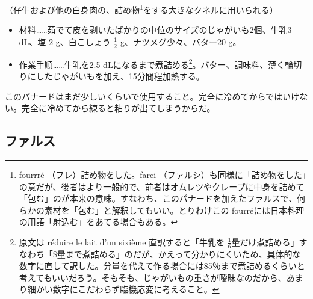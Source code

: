 \begin{recette}
（仔牛および他の白身肉の、詰め物\footnote{fourrré
  （フレ）詰め物をした。farci
  （ファルシ）も同様に「詰め物をした」の意だが、後者はより一般的で、前者はオムレツやクレープに中身を詰めて「包む」のが本来の意味。すなわち、このパナードを加えたファルスで、何らかの素材を「包む」と解釈してもいい。とりわけこの
  fourréには日本料理の用語「射込む」をあてる場合もある。}をする大きなクネルに用いられる）

\begin{itemize}
\item
  材料\ldots{}\ldots{}茹でて皮を剥いたばかりの中位のサイズのじゃがいも2個、牛乳3
  dL、塩 2 g、白こしょう \(\frac{1}{2}\) g、ナツメグ少々、バター20 g。
\item
  作業手順\ldots{}\ldots{}牛乳を2.5 dLになるまで煮詰める\footnote{原文は
    réduire le lait d'un sixième 直訳すると「牛乳を
    \(\frac{1}{6}\)量だけ煮詰める」すなわち「\$量まで煮詰める」のだが、かえって分かりにくいため、具体的な数字に直して訳した。分量を代えて作る場合には85％まで煮詰めるくらいと考えてもいいだろう。そもそも、じゃがいもの重さが曖昧なのだから、あまり細かい数字にこだわらず臨機応変に考えること。}。バター、調味料、薄く輪切りにしたじゃがいもを加え、15分間程加熱する。
\end{itemize}

このパナードはまだ少しいくらいで使用すること。完全に冷めてからではいけない。完全に冷めてから練ると粘りが出てしまうからだ。
\end{recette}
\hypertarget{farces}{%
\subsection{ファルス}\label{farces}}


 

